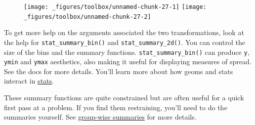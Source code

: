 \begin{Shaded}
\begin{Highlighting}[]
\StringTok{ }
\StringTok{  }\NormalTok{(} \NormalTok{) +}\StringTok{ }
\StringTok{  }\NormalTok{(}\NormalTok{, }\NormalTok{) +}\StringTok{ }
\StringTok{  }\NormalTok{(}\NormalTok{, }\NormalTok{)}

 \StringTok{ }
\StringTok{  }\NormalTok{(} \NormalTok{, } \NormalTok{, } \StringTok{ }
\StringTok{  }\NormalTok{(}\NormalTok{, }\NormalTok{) +}\StringTok{ }
\StringTok{  }\NormalTok{(}\NormalTok{, }\NormalTok{)}
\end{Highlighting}
\end{Shaded}

\begin{figure}[H]
  \texttt{[image: \_figures/toolbox/unnamed-chunk-27-1]}%
  \texttt{[image: \_figures/toolbox/unnamed-chunk-27-2]}
\end{figure}

To get more help on the arguments associated the two transformations,
look at the help for \texttt{stat\_summary\_bin()} and
\texttt{stat\_summary\_2d()}. You can control the size of the bins and
the summary functions. \texttt{stat\_summary\_bin()} can produce
\texttt{y}, \texttt{ymin} and \texttt{ymax} aesthetics, also making it
useful for displaying measures of spread. See the docs for more details.
You'll learn more about how geoms and stats interact in
\hyperref[sec:stat]{stats}.

These summary functions are quite constrained but are often useful for a
quick first pass at a problem. If you find them restraining, you'll need
to do the summaries yourself. See \hyperref[sec:summarise]{group-wise
summaries} for more details.

